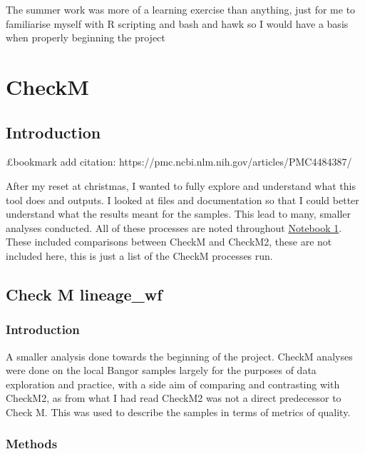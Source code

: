\documentclass[
  letterpaper,
  DIV=11,
  numbers=noendperiod]{scrreprt}
\begin{document}
The summer work was more of a learning exercise than anything, just for
me to familiarise myself with R scripting and bash and hawk so I would
have a basis when properly beginning the project


\chapter{CheckM}\label{checkm}

\section{Introduction}\label{introduction-2}

£bookmark add citation:
https://pmc.ncbi.nlm.nih.gov/articles/PMC4484387/

After my reset at christmas, I wanted to fully explore and understand
what this tool does and outputs. I looked at files and documentation so
that I could better understand what the results meant for the samples.
This lead to many, smaller analyses conducted. All of these processes
are noted throughout
\href{https://github.com/tobiasnunn/tnunn_research/blob/bdbe0829dcf76cafce52d0f1449cb69615d6af3f/Research_Experience_Module/Notebook.Rmd}{Notebook
1}. These included comparisons between CheckM and CheckM2, these are not
included here, this is just a list of the CheckM processes run.

\section{Check M lineage\_wf}\label{check-m-lineage_wf}

\subsection{Introduction}\label{introduction-3}

A smaller analysis done towards the beginning of the project. CheckM
analyses were done on the local Bangor samples largely for the purposes
of data exploration and practice, with a side aim of comparing and
contrasting with CheckM2, as from what I had read CheckM2 was not a
direct predecessor to Check M. This was used to describe the samples in
terms of metrics of quality.

\subsection{Methods}\label{methods-1}
\end{document}
